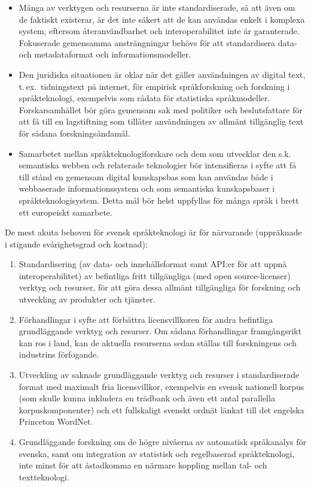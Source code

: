 \begin{multicols}{2}
\begin{itemize}
\item Många av verktygen och resurserna är inte standardiserade, så
  att även om de faktiskt exi\-ste\-rar, är det inte säkert att de kan
  användas enkelt i komplexa system, eftersom åter\-an\-vänd\-bar\-het
  och inter\-operabilitet inte är garanterade. Fokuserade gemensamma
  ansträngningar behövs för att standardisera \mbox{data-} och
  metadataformat och informationsmodeller.
\item Den juridiska situationen är oklar när det gäller användningen
  av digital text, t.\,ex.~tidningstext på internet, för empirisk
  språkforskning och forskning i språkteknologi, exempelvis som rådata
  för statistiska språkmodeller. Forskarsamhället bör göra gemensam
  sak med politiker och beslutsfattare för att få till en lagstiftning
  som tillåter användningen av allmänt tillgänglig text för sådana
  forskningsändamål.
\item Samarbetet mellan språkteknologiforskare och dem som utvecklar
  den s.k. semantiska webben och relaterade teknologier bör
  intensifieras i syfte att få till stånd en gemensam digital
  kunskapsbas som kan användas både i webbaserade informationssystem
  och som semantiska kunskapsbaser i språk\-tekno\-logi\-sys\-tem. Detta mål
  bör helst uppfyllas för många språk i brett ett europeiskt
  samarbete.

\end{itemize}

De mest akuta behoven för svensk språkteknologi är för närvarande
(uppräknade i stigande svårighetsgrad och kostnad):

\begin{enumerate}
\item Standardisering (av data- och innehållsformat samt API:er för
  att uppnå interoperabilitet) av befintliga fritt tillgängliga (med
  open source-licenser) verktyg och resurser, för att göra dessa
  allmänt tillgängliga för forskning och utveckling av produkter och
  tjänster.
\item Förhandlingar i syfte att förbättra licensvillkoren för andra
  befintliga grundläggande verktyg och resurser. Om sådana
  förhandlingar framgångsrikt kan ros i land, kan de aktuella
  resurserna sedan ställas till forskningens och industrins
  förfogande.
\item Utveckling av saknade grundläggande verktyg och resurser i
  standardiserade format med maximalt fria licensvillkor, exempelvis
  en svensk nationell korpus (som skulle kunna inkludera en trädbank
  och även ett antal parallella korpuskomponenter) och ett fullskaligt
  svenskt ordnät länkat till det engelska Princeton WordNet.
\item Grundläggande forskning om de högre nivåerna av automatisk
  språkanalys för svenska, samt om integration av statistisk och
  regelbaserad språkteknologi, inte minst för att åstadkomma en
  närmare koppling mellan \mbox{tal-} och textteknologi.
\end{enumerate}


\end{multicols}
